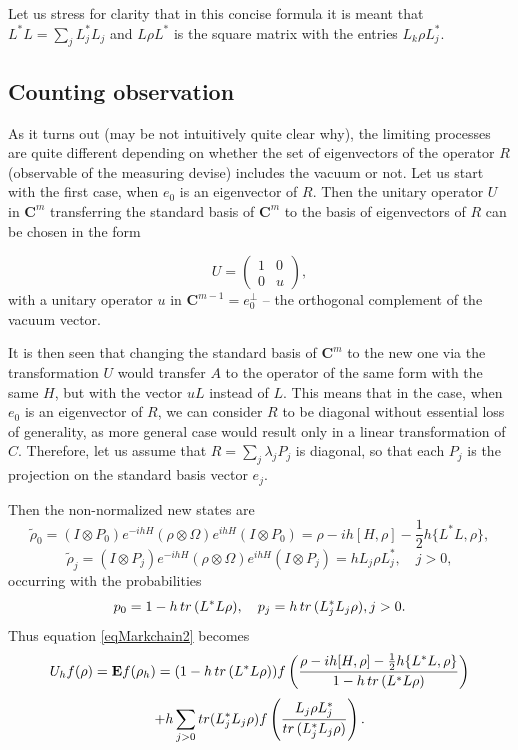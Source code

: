 \documentclass[10pt,a4paper]{amsart}
\def\C{\mathbf{C}}
\def\E{\mathbf{E}}
\def\tr{\rm{tr}}
\newcommand{\la}{\lambda}
\newcommand{\Om}{\Omega}
\begin{document}
Let us stress for clarity that in this concise formula it is meant
 that $L^*L=\sum_j L_j^*L_j$ and $L\rho L^*$ is the square matrix
with the entries $L_k \rho L_j^*$.

\subsection{Counting observation}
\label{seccountcase}

As it turns out (may be not intuitively quite clear why),
the limiting processes are quite different depending on whether
the set of eigenvectors of the operator $R$ (observable of the measuring devise) includes the vacuum or not.
Let us start with the first case, when $e_0$ is an eigenvector of $R$.
Then the unitary operator $U$ in $\C^m$ transferring the standard basis
of $\C^m$ to the basis of eigenvectors of $R$ can be chosen in the form

\begin{equation}
\label{eqdiagonproj}
U= \begin{pmatrix} 1 & 0 \\ 0 & u \end{pmatrix},
\end{equation}
with a unitary operator $u$ in $\C^{m-1}=e_0^{\perp}$ -- the orthogonal complement of the vacuum vector.

It is then seen that changing the standard basis of $\C^m$ to the new one via the transformation $U$ would
transfer $A$ to the operator of the same form with the same $H$, but with the vector $uL$ instead of $L$.
This means that in the case, when $e_0$ is an eigenvector of $R$, we can consider $R$ to be diagonal without
essential loss of generality, as more general case would result only in a linear
transformation of $C$. Therefore, let us assume that $R=\sum_j \la_j P_j$ is diagonal, so that each $P_j$
is the projection on the standard basis vector $e_j$.

 Then the non-normalized new states are
\[
\tilde \rho_0=(I\otimes P_0) e^{-ihH} (\rho \otimes \Om) e^{ihH} (I\otimes P_0)
= \rho -ih[H, \rho] -\frac12 h\{L^*L,\rho\},
\]
\[
\tilde \rho_j=(I\otimes P_j) e^{-ihH} (\rho \otimes\Om) e^{ihH} (I\otimes P_j)
= hL_j\rho L_j^*, \quad j>0,
\]
occurring with the probabilities
\[
p_0=1-h \, {\tr} \, (L^*L \rho), \quad p_j=h \, {\tr}\, (L_j^*L_j \rho), j>0.
\]
Thus equation \eqref{eqMarkchain2} becomes
\[
U_h f(\rho)=\E f(\rho_h)=(1-h \, {\tr} \, (L^*L \rho))f
\left( \frac{\rho -ih[H, \rho] -\frac12 h\{L^*L,\rho\}}{1-h \, {\tr} \, (L^*L \rho)}\right)
\]
\begin{equation}
\label{eqMarkchaindiag}
+h \sum_{j>0} {\tr} (L_j^*L_j \rho) f\left(\frac{L_j \rho L_j^*}{{\tr}\, (L_j^*L_j \rho)}\right).
\end{equation}
\end{document}
